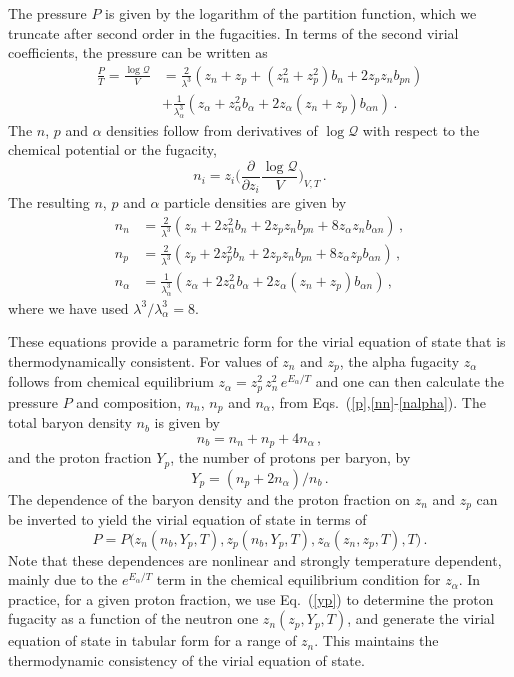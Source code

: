 \documentclass[aps,prc,twocolumn,showpacs,showkeys,amsmath,amssymb]{revtex4}
\begin{document}
The pressure $P$ is given by the logarithm of the partition function,
which we truncate after second order in the fugacities. In terms of 
the second virial coefficients, the pressure can be written as
\begin{align}
\frac{P}{T}=\frac{\log \mathcal{Q}}{V}&=\frac{2}{\lambda^3}(z_n+z_p +
(z_n^2+z_p^2) b_n + 2 z_p z_n b_{pn}) \nonumber \\[1mm]
&+\frac{1}{\lambda_\alpha^3}(z_\alpha + z_\alpha^2 b_\alpha + 2 
z_\alpha (z_n+z_p) b_{\alpha n}) \,.
\label{p}
\end{align}
The $n$, $p$ and $\alpha$ densities follow from derivatives of $\log 
\mathcal{Q}$ with respect to the chemical potential or the fugacity,
\begin{equation}
n_i = z_i \biggl(\frac{\partial}{\partial z_i} \frac{\log \mathcal{Q}}{V}
\biggr)_{V,T} \,.
\end{equation}
The resulting $n$, $p$ and $\alpha$ particle densities are given by
\begin{align}
n_n &= \frac{2}{\lambda^3}(z_n+2z_n^2b_n+2z_pz_nb_{pn}+8z_\alpha z_n 
b_{\alpha n}) \,, \label{nn} \\[1mm]
n_p &= \frac{2}{\lambda^3}(z_p+2z_p^2b_n+2z_pz_nb_{pn}+8z_\alpha z_p 
b_{\alpha n}) \,, \label{np} \\[1mm]
n_\alpha &= \frac{1}{\lambda_\alpha^3}(z_\alpha+2z_\alpha^2b_\alpha+
2z_\alpha(z_n+z_p)b_{\alpha n}) \,, \label{nalpha}
\end{align}
where we have used $\lambda^3/\lambda_\alpha^3=8$.

These equations provide a parametric form for the virial equation of 
state that is thermodynamically consistent.  
For values of $z_n$ and $z_p$, the alpha fugacity $z_\alpha$ follows 
from chemical equilibrium $z_\alpha = z_p^2 \, z_n^2 \, e^{E_\alpha/T}$ 
and one can then calculate the pressure $P$ and composition, $n_n$, $n_p$ and 
$n_\alpha$, from Eqs.~(\ref{p},\ref{nn}-\ref{nalpha}). The total baryon 
density $n_b$ is given by
\begin{equation}
n_b=n_n+n_p+4n_\alpha \,,
\label{nb}
\end{equation}
and the proton fraction $Y_p$, the number of protons per baryon, by
\begin{equation}
Y_p=(n_p+2n_\alpha)/n_b \,.
\label{yp}
\end{equation}
The dependence of the baryon density and the 
proton fraction on $z_n$ and $z_p$ 
can be inverted to yield the virial equation of state in terms of
\begin{equation}
P = P\bigl(z_n(n_b,Y_p,T),z_p(n_b,Y_p,T),z_\alpha(z_n,z_p,T),T\bigr) \,.
\end{equation}
Note that these dependences are nonlinear and strongly temperature 
dependent, mainly due to the $e^{E_\alpha/T}$ term in the chemical 
equilibrium condition for $z_\alpha$. In practice, for a given proton
fraction, we use Eq.~(\ref{yp}) to determine the proton fugacity as
a function of the neutron one $z_n(z_p,Y_p,T)$, and generate the virial
equation of state in tabular form for a range of $z_n$. This maintains
the thermodynamic consistency of the virial equation of state.
\end{document}
